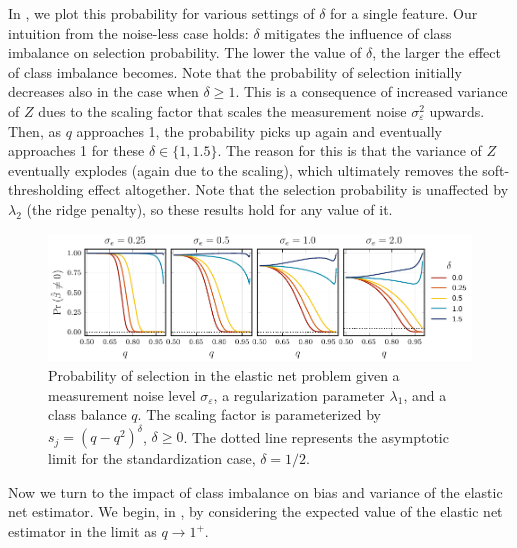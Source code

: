 In , we plot this probability for various settings of \(\delta\) for a single feature. Our intuition from the noise-less case holds: \(\delta\) mitigates the influence of class imbalance on selection probability. The lower the value of \(\delta\), the larger the effect of class imbalance becomes. Note that the probability of selection initially decreases also in the case when \(\delta \geq 1\). This is a consequence of increased variance of \(Z\) dues to the scaling factor that scales the measurement noise \(\sigma_\varepsilon^2\) upwards. Then, as \(q\) approaches 1, the probability picks up again and eventually approaches 1 for these \(\delta \in \{1, 1.5\}\). The reason for this is that the variance of \(Z\) eventually explodes (again due to the scaling), which ultimately removes the soft-thresholding effect altogether. Note that the selection probability is unaffected by \(\lambda_2\) (the ridge penalty), so these results hold for any value of it.

\begin{figure}[htpb]
  \centering
  \includegraphics[]{plots/selection_probability.pdf}
  \caption{%
    Probability of selection in the elastic net problem given a measurement noise level \(\sigma_\varepsilon\), a regularization parameter \(\lambda_1\), and a class balance \(q\). The scaling factor is parameterized by \(s_j = (q - q^2)^\delta\), \(\delta \geq 0\). The dotted line represents the asymptotic limit for the standardization case, \(\delta = 1/2\).}
  \label{fig:selection-probability}
\end{figure}

Now we turn to the impact of class imbalance on bias and variance of the elastic net estimator. We begin, in , by considering the expected value of the elastic net estimator in the limit as \(q \rightarrow 1^+\).

